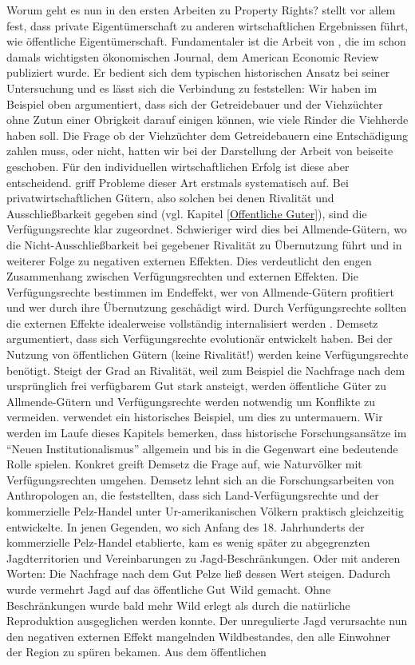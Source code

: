 Worum geht es nun in den ersten Arbeiten zu Property Rights? \textcite{Alchian1965} stellt vor allem fest, dass private Eigentümerschaft zu anderen wirtschaftlichen Ergebnissen führt, wie öffentliche Eigentümerschaft. Fundamentaler ist die Arbeit von \textcite{Demsetz1967}, die im schon damals wichtigsten ökonomischen Journal, dem American Economic Review publiziert wurde. Er bedient sich dem typischen historischen Ansatz bei seiner Untersuchung und es lässt sich die Verbindung zu \textcite{Coase1960} feststellen: Wir haben im Beispiel oben argumentiert, dass sich der Getreidebauer und der Viehzüchter ohne Zutun einer Obrigkeit darauf einigen können, wie viele Rinder die Viehherde haben soll. Die Frage ob der Viehzüchter dem Getreidebauern eine Entschädigung zahlen muss, oder nicht, hatten wir bei der Darstellung der Arbeit von \textcite{Coase1960} beiseite geschoben. Für den individuellen wirtschaftlichen Erfolg ist diese aber entscheidend. \textcite{Demsetz1967} griff Probleme dieser Art erstmals systematisch auf. Bei privatwirtschaftlichen Gütern, also solchen bei denen Rivalität und Ausschließbarkeit gegeben sind (vgl. Kapitel \ref{Offentliche Guter}), sind die Verfügungsrechte klar zugeordnet. Schwieriger wird dies bei Allmende-Gütern, wo die Nicht-Ausschließbarkeit bei gegebener Rivalität zu Übernutzung führt und in weiterer Folge zu negativen externen Effekten. Dies verdeutlicht den engen Zusammenhang zwischen Verfügungsrechten und externen Effekten. Die Verfügungsrechte bestimmen im Endeffekt, wer von Allmende-Gütern profitiert und wer durch ihre Übernutzung geschädigt wird. Durch Verfügungsrechte sollten die externen Effekte idealerweise vollständig internalisiert werden \parencite[S. 348]{Demsetz1967}. Demsetz argumentiert, dass sich Verfügungsrechte evolutionär entwickelt haben. Bei der Nutzung von öffentlichen Gütern (keine Rivalität!) werden keine Verfügungsrechte benötigt. Steigt der Grad an Rivalität, weil zum Beispiel die Nachfrage nach dem ursprünglich frei verfügbarem Gut stark ansteigt, werden öffentliche Güter zu Allmende-Gütern und Verfügungsrechte werden notwendig um Konflikte zu vermeiden. \textcite{Demsetz1967} verwendet ein historisches Beispiel, um dies zu untermauern. Wir werden im Laufe dieses Kapitels bemerken, dass historische Forschungsansätze im "`Neuen Institutionalismus"' allgemein und bis in die Gegenwart eine bedeutende Rolle spielen. Konkret greift Demsetz die Frage auf, wie Naturvölker mit Verfügungsrechten umgehen. Demsetz lehnt sich an die Forschungsarbeiten von Anthropologen an, die feststellten, dass sich Land-Verfügungsrechte und der kommerzielle Pelz-Handel unter Ur-amerikanischen Völkern praktisch gleichzeitig entwickelte. In jenen Gegenden, wo sich Anfang des 18. Jahrhunderts der kommerzielle Pelz-Handel etablierte, kam es wenig später zu abgegrenzten Jagdterritorien und Vereinbarungen zu Jagd-Beschränkungen. Oder mit anderen Worten: Die Nachfrage nach dem Gut Pelze ließ dessen Wert steigen. Dadurch wurde vermehrt Jagd auf das öffentliche Gut Wild gemacht. Ohne Beschränkungen wurde bald mehr Wild erlegt als durch die natürliche Reproduktion ausgeglichen werden konnte. Der unregulierte Jagd verursachte nun den negativen externen Effekt mangelnden Wildbestandes, den alle Einwohner der Region zu spüren bekamen. Aus dem öffentlichen 